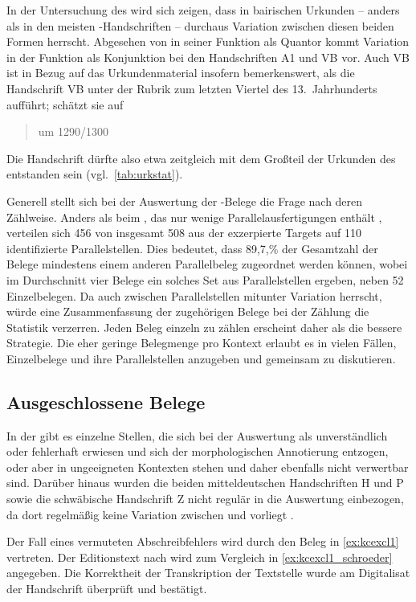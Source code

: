 In der Untersuchung des \CAO{} wird sich zeigen, dass in bairischen
Urkunden -- anders als in den meisten \KC{}-Handschriften -- durchaus
Variation zwischen diesen beiden Formen herrscht. Abgesehen von  in
seiner Funktion als Quantor kommt Variation in der Funktion als Konjunktion bei
den Handschriften A1 und VB vor. Auch VB ist
in Bezug auf das Urkundenmaterial insofern bemerkenswert, als
\citet[224]{schneider1987} die Handschrift VB unter der Rubrik zum
letzten Viertel des 13.~Jahrhunderts aufführt; \citeauthor{wolf:kckat} schätzt
sie auf \blockcquote[65]{wolf:kckat}{um 1290/1300}. Die Handschrift dürfte also
etwa zeitgleich mit dem Großteil der Urkunden des \CAO{} entstanden
sein (vgl.~\cref{tab:urkstat}).

Generell stellt sich bei der Auswertung der \KC{}-Belege die Frage
nach deren Zählweise. Anders als beim \CAO{}, das nur wenige
Parallelausfertigungen enthält \autocite[vgl.][326--328]{ganslmayeretal2003},
verteilen sich 456 von insgesamt 508 aus der \KC{} exzerpierte
Targets auf 110 identifizierte Parallelstellen. Dies bedeutet,
dass 89,7,\% der Gesamtzahl der Belege mindestens einem anderen Parallelbeleg
zugeordnet werden können, wobei im Durchschnitt vier Belege ein solches Set aus
Parallelstellen ergeben, neben 52 Einzelbelegen.
Da auch zwischen Parallelstellen mitunter Variation herrscht, würde eine
Zusammenfassung der zugehörigen Belege bei der Zählung die Statistik verzerren.
Jeden Beleg einzeln zu zählen erscheint daher als die bessere Strategie. Die
eher geringe Belegmenge pro Kontext erlaubt es in vielen Fällen, Einzelbelege
und ihre Parallelstellen anzugeben und gemeinsam zu diskutieren.

\subsection{Ausgeschlossene Belege}
\label{subsec:ausgeschlossene_kc}

In der \KC{} gibt es einzelne Stellen, die sich bei der Auswertung als
unverständlich oder fehlerhaft erwiesen und sich der morphologischen
Annotierung entzogen, oder aber in ungeeigneten Kontexten stehen und daher
ebenfalls nicht verwertbar sind. Darüber hinaus wurden die beiden
mitteldeutschen Handschriften H und P sowie die
schwäbische Handschrift Z nicht regulär in die Auswertung
einbezogen, da dort regelmäßig keine Variation zwischen  und
 vorliegt \autocite[vgl. auch][183]{ksw2}.

Der Fall eines vermuteten Abschreibfehlers wird durch den Beleg in
\cref{ex:kcexcl1} vertreten. Der Editionstext nach \nosh\citet{schroeder1895}
wird zum Vergleich in \cref{ex:kcexcl1_schroeder} angegeben. Die Korrektheit
der Transkription der Textstelle wurde am Digitalisat der Handschrift überprüft
und bestätigt.

